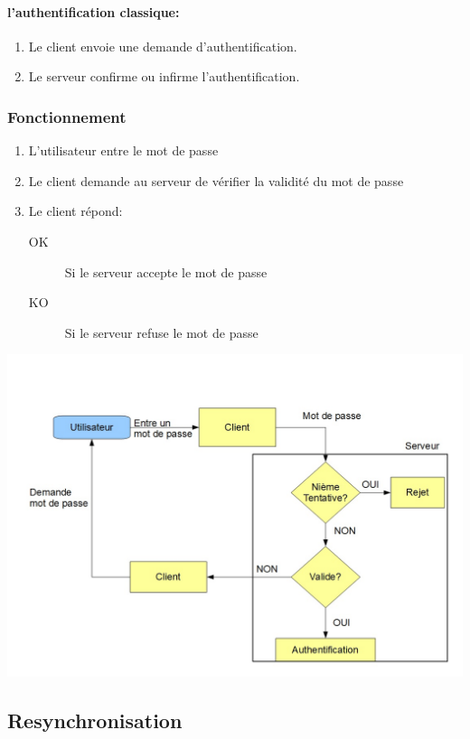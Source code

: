 \documentclass{"../../res/univ-projet"}
\begin{document}
    \paragraph{l'authentification classique:}
    \begin{enumerate}
        \item Le client envoie une demande d'authentification.
        \item Le serveur confirme ou infirme l'authentification.
    \end{enumerate}

\subsubsection{Fonctionnement}
\begin{enumerate}
    \item L'utilisateur entre le mot de passe
    \item Le client demande au serveur de vérifier la validité du
        mot de passe
    \item Le client répond:
        \begin{description}
            \item[OK] Si le serveur accepte le mot de passe
            \item[KO] Si le serveur refuse le mot de passe
        \end{description}
\end{enumerate}
\includegraphics[width=\textwidth]{../graphics/authentification.jpg}

\subsection{Resynchronisation}
\end{document}
